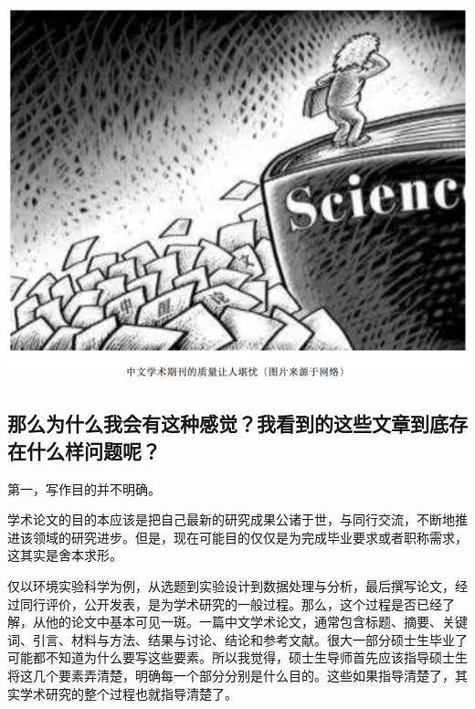 \documentclass[
]{book}
\begin{document}
\includegraphics[width=8.33in]{images/edit1}

\hypertarget{ux90a3ux4e48ux4e3aux4ec0ux4e48ux6211ux4f1aux6709ux8fd9ux79cdux611fux89c9ux6211ux770bux5230ux7684ux8fd9ux4e9bux6587ux7ae0ux5230ux5e95ux5b58ux5728ux4ec0ux4e48ux6837ux95eeux9898ux5462}{%
\subsection{那么为什么我会有这种感觉？我看到的这些文章到底存在什么样问题呢？}\label{ux90a3ux4e48ux4e3aux4ec0ux4e48ux6211ux4f1aux6709ux8fd9ux79cdux611fux89c9ux6211ux770bux5230ux7684ux8fd9ux4e9bux6587ux7ae0ux5230ux5e95ux5b58ux5728ux4ec0ux4e48ux6837ux95eeux9898ux5462}}

第一，写作目的并不明确。

学术论文的目的本应该是把自己最新的研究成果公诸于世，与同行交流，不断地推进该领域的研究进步。但是，现在可能目的仅仅是为完成毕业要求或者职称需求，这其实是舍本求形。

仅以环境实验科学为例，从选题到实验设计到数据处理与分析，最后撰写论文，经过同行评价，公开发表，是为学术研究的一般过程。那么，这个过程是否已经了解，从他的论文中基本可见一斑。一篇中文学术论文，通常包含标题、摘要、关键词、引言、材料与方法、结果与讨论、结论和参考文献。很大一部分硕士生毕业了可能都不知道为什么要写这些要素。所以我觉得，硕士生导师首先应该指导硕士生将这几个要素弄清楚，明确每一个部分分别是什么目的。这些如果指导清楚了，其实学术研究的整个过程也就指导清楚了。
\end{document}
